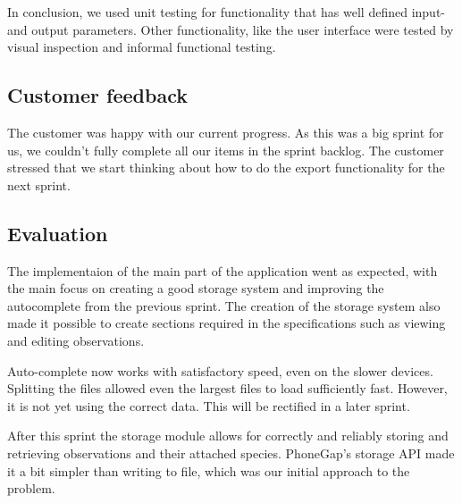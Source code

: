 In conclusion, we used unit testing for functionality that has well defined
input- and output parameters. Other functionality, like the user interface were
tested by visual inspection and informal functional testing.

\subsection{Customer feedback}
The customer was happy with our current progress. As this was a big sprint for
us, we couldn't fully complete all our items in the sprint backlog. The customer
stressed that we start thinking about how to do the export functionality for the
next sprint.

\subsection{Evaluation}
The implementaion of the main part of the application went as expected, with the
main focus on creating a good storage system and improving the autocomplete from
the previous sprint. The creation of the storage system also made it possible to
create sections required in the specifications such as viewing and editing
observations.

Auto-complete now works with satisfactory speed, even on the slower devices. Splitting the files allowed even the largest files to load sufficiently fast. However, it is not yet using the correct data. This will be rectified in a later sprint.

After this sprint the storage module allows for correctly and reliably storing and retrieving observations and their attached species. PhoneGap's storage API made it a bit simpler than writing to file, which was our initial approach to the problem.
